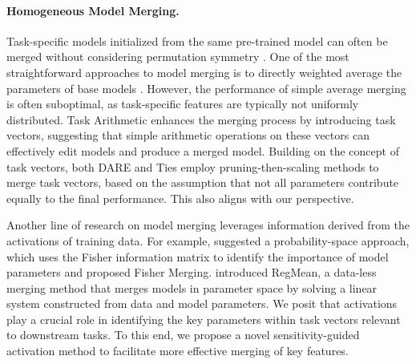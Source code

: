 \paragraph{Homogeneous Model Merging.}
Task-specific models initialized from the same pre-trained model can often be merged without considering permutation symmetry \citep{model_soup, task_arithmetic}. 
One of the most straightforward approaches to model merging is to directly weighted average the parameters of base models \citep{shoemake85, model_soup}. However, the performance of simple average merging is often suboptimal, as task-specific features are typically not uniformly distributed.
Task Arithmetic \citep{task_arithmetic} enhances the merging process by introducing task vectors, suggesting that simple arithmetic operations on these vectors can effectively edit models and produce a merged model. Building on the concept of task vectors, both DARE \citep{dare} and Ties \citep{ties_merging} employ pruning-then-scaling methods to merge task vectors, based on the assumption that not all parameters contribute equally to the final performance. This also aligns with our perspective. 

Another line of research on model merging leverages information derived from the activations of training data. For example, \citet{fisher} suggested a probability-space approach, which uses the Fisher information matrix to identify the importance of model parameters and proposed Fisher Merging. \citet{reg_mean} introduced RegMean, a data-less merging method that merges models in parameter space by solving a linear system constructed from data and model parameters. 
We posit that activations play a crucial role in identifying the key parameters within task vectors relevant to downstream tasks. To this end, we propose a novel sensitivity-guided activation method to facilitate more effective merging of key features.
